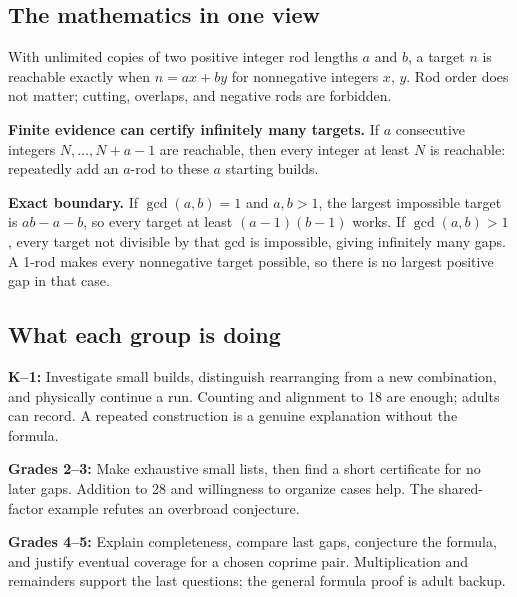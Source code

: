 \subsection*{The mathematics in one view}
With unlimited copies of two positive integer rod lengths $a$ and $b$, a target $n$ is reachable exactly when $n = ax + by$ for nonnegative integers $x$, $y$. Rod order does not matter; cutting, overlaps, and negative rods are forbidden.

\textbf{Finite evidence can certify infinitely many targets.} If $a$ consecutive integers $N, \dots, N+a-1$ are reachable, then every integer at least $N$ is reachable: repeatedly add an $a$-rod to these $a$ starting builds.

\textbf{Exact boundary.} If $\gcd(a,b)=1$ and $a,b>1$, the largest impossible target is $ab-a-b$, so every target at least $(a-1)(b-1)$ works. If $\gcd(a,b)>1$, every target not divisible by that gcd is impossible, giving infinitely many gaps. A 1-rod makes every nonnegative target possible, so there is no largest positive gap in that case.

\subsection*{What each group is doing}
\textbf{K--1:} Investigate small builds, distinguish rearranging from a new combination, and physically continue a run. Counting and alignment to 18 are enough; adults can record. A repeated construction is a genuine explanation without the formula.

\textbf{Grades 2--3:} Make exhaustive small lists, then find a short certificate for no later gaps. Addition to 28 and willingness to organize cases help. The shared-factor example refutes an overbroad conjecture.

\textbf{Grades 4--5:} Explain completeness, compare last gaps, conjecture the formula, and justify eventual coverage for a chosen coprime pair. Multiplication and remainders support the last questions; the general formula proof is adult backup.

